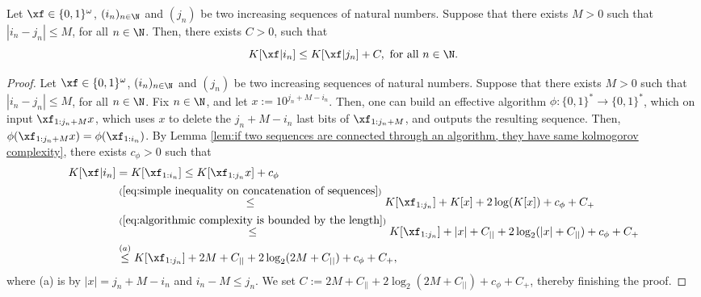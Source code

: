 \begin{lemma}\label{lem:kolmogorov complexity of closed sequences}
	Let $\xf \in \{0,1\}^\omega$, $(i_n)_{n \in \N}$ and $(j_n)$ be two increasing sequences of natural numbers. Suppose that there exists $M > 0$ such that $|i_n-j_n| \leq M$, for all $n \in \N$. Then, there exists $C>0$, such that
	\begin{equation}
		K[\xf|i_n] \leq K[\xf|j_n] + C, \ \text{for all} \ n \in \N.
	\end{equation}
\end{lemma}
\begin{proof}
	Let $\xf \in \{0,1\}^\omega$, $(i_n)_{n \in \N}$ and $(j_n)$ be two increasing sequences of natural numbers. Suppose that there exists $M > 0$ such that $ |i_n-j_n| \leq M$, for all $n \in \N$. Fix $n \in \N$, and let $x:= 10^{j_n + M-i_n}$. Then, one can build an effective algorithm $\phi: \{0,1\}^\ast \to \{0,1\}^\ast$, which on input $\xf_{1: j_n + M}  x$, which uses $x$ to delete the $j_n + M - i_n$ last bits of $\xf_{1: j_n + M}$, and outputs the resulting sequence. Then, $\phi(\xf_{1: j_n + M}  x) = \phi(\xf_{1: i_n})$. By Lemma \ref{lem:if two sequences are connected through an algorithm, they have same kolmogorov complexity}, there exists $c_\phi > 0$ such that
	\begin{align}
		K[\xf|i_n] &= K[\xf_{1: i_n}] \leq K[\xf_{1: j_n}  x] + c_\phi\\
		&\overset{(\ref{eq:simple inequality on concatenation of sequences})}{\leq} K[\xf_{1: j_n}] + K[x] + 2\log(K[x]) +c_{\phi} + C_{+}\\
		&\overset{(\ref{eq:algorithmic complexity is bounded by the length})}{\leq} K[\xf_{1: j_n}] + |x| + C_{||} + 2 \log_2 (|x| + C_{||}) + c_\phi + C_{+}\\
		&\overset{(a)}{\leq} K[\xf_{1: j_n}] + 2M + C_{||} + 2 \log_2 (2M + C_{||}) + c_\phi + C_{+},
	\end{align}
	where (a) is by $|x| = j_n + M - i_n$ and $i_n - M \leq j_n$. We set $C:= 2M + C_{||} + 2 \log_2 (2M + C_{||}) + c_\phi+ C_{+}$, thereby finishing the proof.
\end{proof}
